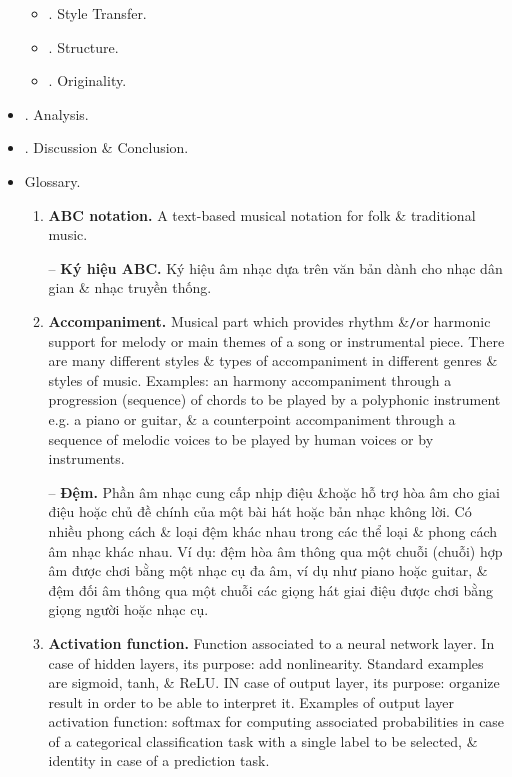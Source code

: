\documentclass{article}
\begin{document}
\begin{itemize}
\begin{itemize}
\begin{itemize}
		\end{itemize}
		\item {. Style Transfer.}
		\item {. Structure.}
		\item {. Originality.}
	\end{itemize}
	\item {. Analysis.}
	\item {. Discussion \& Conclusion.}
	\item {\sf Glossary.}
	\begin{enumerate}
		\item {\bf ABC notation.} A text-based musical notation for folk \& traditional music.
		
		-- {\bf Ký hiệu ABC.} Ký hiệu âm nhạc dựa trên văn bản dành cho nhạc dân gian \& nhạc truyền thống.
		\item {\bf Accompaniment.} Musical part which provides rhythm \&{\tt/}or harmonic support for melody or main themes of a song or instrumental piece. There are many different styles \& types of accompaniment in different genres \& styles of music. Examples: an harmony accompaniment through a progression (sequence) of chords to be played by a polyphonic instrument e.g. a piano or guitar, \& a counterpoint accompaniment through a sequence of melodic voices to be played by human voices or by instruments.
		
		-- {\bf Đệm.} Phần âm nhạc cung cấp nhịp điệu \&{\tt}hoặc hỗ trợ hòa âm cho giai điệu hoặc chủ đề chính của một bài hát hoặc bản nhạc không lời. Có nhiều phong cách \& loại đệm khác nhau trong các thể loại \& phong cách âm nhạc khác nhau. Ví dụ: đệm hòa âm thông qua một chuỗi (chuỗi) hợp âm được chơi bằng một nhạc cụ đa âm, ví dụ như piano hoặc guitar, \& đệm đối âm thông qua một chuỗi các giọng hát giai điệu được chơi bằng giọng người hoặc nhạc cụ.
		\item {\bf Activation function.} Function associated to a neural network layer. In case of hidden layers, its purpose: add nonlinearity. Standard examples are sigmoid, tanh, \& ReLU. IN case of output layer, its purpose: organize result in order to be able to interpret it. Examples of output layer activation function: softmax for computing associated probabilities in case of a categorical classification task with a single label to be selected, \& identity in case of a prediction task.
		

\end{enumerate}
\end{itemize}
\end{document}
